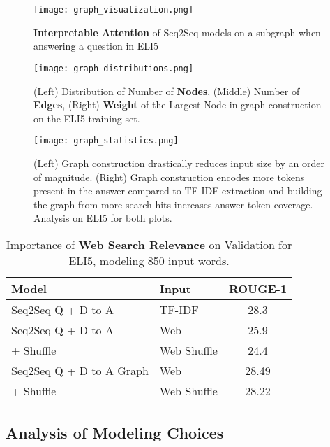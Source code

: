 \documentclass[11pt,a4paper]{article}
\newcommand*{\round}[1]{\num[round-mode=places,round-precision=1]{#1}}
\begin{document}
\begin{figure*}[t!]
    \centering
    \texttt{[image: graph\_visualization.png]}
    \caption{\textbf{Interpretable Attention} of Seq2Seq models on a subgraph when answering a question in ELI5}
    \label{fig:graph_attention}
\end{figure*}

\begin{figure*}[t!]
    \centering
    \texttt{[image: graph\_distributions.png]}
    \caption{(Left) Distribution of Number of \textbf{Nodes}, (Middle) Number of \textbf{Edges}, (Right) \textbf{Weight} of the Largest Node in graph construction on the ELI5 training set.}
    \label{fig:graph_distribution}
\end{figure*}

\begin{figure}[t!]
    \centering
    \texttt{[image: graph\_statistics.png]}
    \caption{(Left) Graph construction drastically reduces input size by an order of magnitude. (Right) Graph construction encodes more tokens present in the answer compared to TF-IDF extraction and building the graph from more search hits increases answer token coverage. Analysis on ELI5 for both plots.}
    \label{fig:graph_statistics}
\end{figure}

\begin{table}[t!]
  \centering \small
  \begin{tabular}{ l l c }\toprule
\bf{Model} & \bf{Input} & \bf{ROUGE-1}\\\hline\hline
Seq2Seq Q + D to A  & TF-IDF  & 28.3 \\
        Seq2Seq Q + D to A  & Web  & 25.9 \\
        + Shuffle           & Web Shuffle  & 24.4 \\ \hline 
        Seq2Seq Q + D to A Graph   & Web &  \round{28.49} \\ 
        + Shuffle           & Web Shuffle  & \round{28.22} \\
        \bottomrule
\end{tabular}
   \caption{Importance of \textbf{Web Search Relevance} on Validation for ELI5, modeling 850 input words.}
 \label{tbl:shuffle_input}
\end{table}

\subsection{Analysis of Modeling Choices} 
\end{document}
